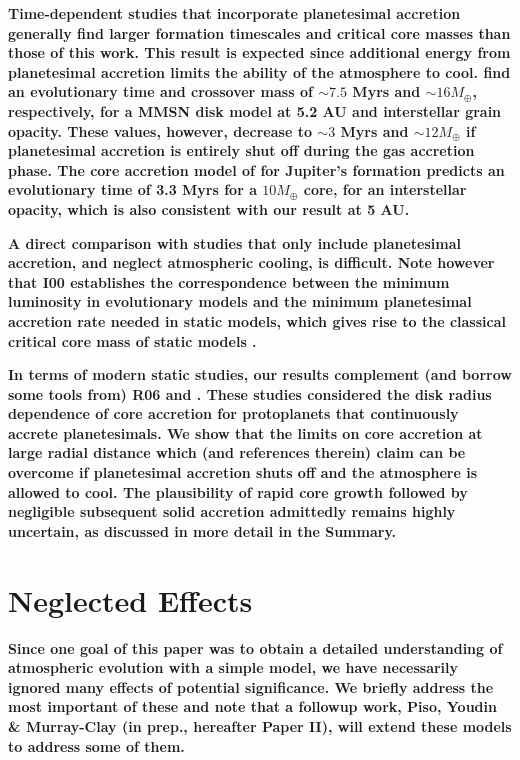 \documentclass[apj, numberedappendix]{emulateapj}
\begin{document}
\textbf{Time-dependent studies that incorporate planetesimal accretion generally find larger formation timescales and critical core masses than those of this work.  This result is expected since additional energy from planetesimal accretion limits the ability of the atmosphere to cool. \citet{pollack96} find an evolutionary time and crossover mass of $\sim$$7.5$ Myrs and $\sim$$16 M_{\oplus}$, respectively, for a MMSN disk model at 5.2 AU and interstellar grain opacity. These values, however, decrease to $\sim$$3$ Myrs and $\sim$$12 M_{\oplus}$ if planetesimal accretion is entirely shut off during the gas accretion phase. The core accretion model of \citet{HubBod05} for Jupiter's formation predicts an evolutionary time of 3.3 Myrs for a $10 M_{\oplus}$ core, for an interstellar opacity, which is also consistent with our result at 5 AU.}

\textbf{A direct comparison with studies that only include planetesimal accretion, and neglect atmospheric cooling, is difficult.  Note however that I00 establishes the correspondence between the minimum luminosity in evolutionary models and the minimum planetesimal accretion rate needed in static models, which gives rise to the classical critical core mass of static models \citep{mizuno78, stevenson82}.}

\textbf{In terms of modern static studies, our results complement (and borrow some tools from) R06 and \citet{Raf11}.  These studies considered the disk radius dependence of core accretion for protoplanets that continuously accrete planetesimals.  We show that the limits on core accretion at large radial distance which \cite{Raf11} (and references therein) claim can be overcome if planetesimal accretion shuts off and the atmosphere is allowed to cool.  The plausibility of rapid core growth followed by negligible subsequent solid accretion admittedly remains highly uncertain, as discussed in more detail in the Summary.}


\section{Neglected Effects}\label{sec:neglected}
\textbf{Since one goal of this paper was to obtain a detailed understanding of atmospheric evolution with a simple model, we have necessarily ignored many  effects of potential significance.  We briefly address the most important of these and note that a followup work, Piso, Youdin \& Murray-Clay (in prep., hereafter Paper II), will extend these models to address some of them.}
\end{document}
